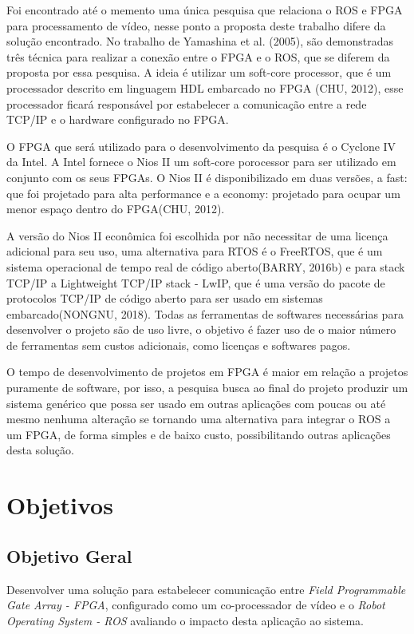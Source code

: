 Foi encontrado até o memento uma única pesquisa que relaciona o ROS e FPGA para 
processamento de vídeo, nesse ponto a proposta deste trabalho difere da solução encontrado. 
No trabalho de Yamashina et al. (2005), são demonstradas três técnica para realizar a 
conexão entre o FPGA e o ROS, que se diferem da proposta por essa pesquisa. A ideia é 
utilizar um soft-core processor, que é um processador descrito em linguagem HDL embarcado 
no FPGA (CHU, 2012), esse processador ficará responsável por estabelecer a comunicação entre 
a rede TCP/IP e o hardware configurado no FPGA.

O FPGA que será utilizado para o desenvolvimento da pesquisa é o Cyclone IV da Intel. A Intel 
fornece o Nios II um soft-core porocessor para ser utilizado em conjunto com os seus FPGAs. 
O Nios II é disponibilizado em duas versões, a fast: que foi projetado para alta performance e 
a economy: projetado para ocupar um menor espaço dentro do FPGA(CHU, 2012).

A versão do Nios II econômica foi escolhida por não necessitar de uma licença adicional para 
seu uso, uma alternativa para RTOS é o FreeRTOS, que é um sistema operacional de tempo real de 
código aberto(BARRY, 2016b) e para stack TCP/IP a Lightweight TCP/IP stack - LwIP, que é uma 
versão do pacote de protocolos TCP/IP de código aberto para ser usado em sistemas 
embarcado(NONGNU, 2018). Todas as ferramentas de softwares necessárias para desenvolver o 
projeto são de uso livre, o objetivo é fazer uso de o maior número de ferramentas sem custos 
adicionais, como licenças e softwares pagos.

O tempo de desenvolvimento de projetos em FPGA é maior em relação a projetos puramente de 
software, por isso, a pesquisa busca ao final do projeto produzir um sistema genérico que possa 
ser usado em outras aplicações com poucas ou até mesmo nenhuma alteração se tornando uma 
alternativa para integrar o ROS a um FPGA, de forma simples e de baixo custo, possibilitando 
outras aplicações desta solução.

\section{Objetivos}

\subsection{Objetivo Geral}

Desenvolver uma solução para estabelecer comunicação entre \textit{Field Programmable Gate Array - FPGA}, 
configurado como um co-processador de vídeo e o  \textit{Robot Operating System - ROS} avaliando 
o impacto desta aplicação ao sistema.

